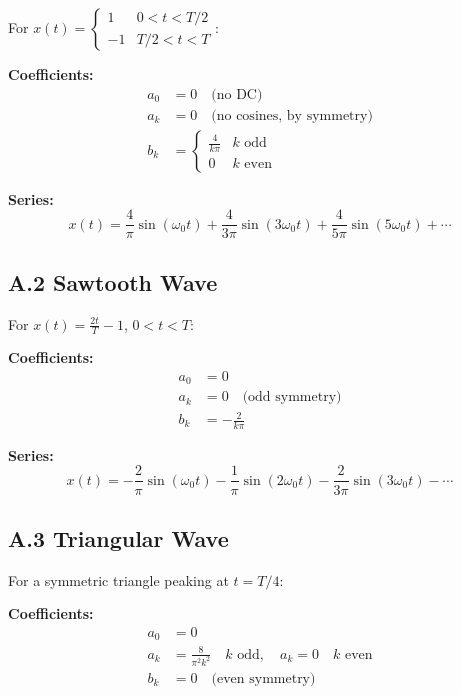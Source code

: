 \documentclass[11pt,letterpaper]{article}
\begin{document}
For $x(t) = \begin{cases} 1 & 0 < t < T/2 \\ -1 & T/2 < t < T \end{cases}$:

\textbf{Coefficients:}
\begin{align}
a_0 &= 0 \quad \text{(no DC)} \\
a_k &= 0 \quad \text{(no cosines, by symmetry)} \\
b_k &= \begin{cases} \frac{4}{k\pi} & k \text{ odd} \\ 0 & k \text{ even} \end{cases}
\end{align}

\noindent
\textbf{Series:}
\begin{equation}
x(t) = \frac{4}{\pi} \sin(\omega_0 t) + \frac{4}{3\pi} \sin(3\omega_0 t) + \frac{4}{5\pi} \sin(5\omega_0 t) + \cdots
\end{equation}

\subsection*{A.2 Sawtooth Wave}

For $x(t) = \frac{2t}{T} - 1$, $0 < t < T$:

\textbf{Coefficients:}
\begin{align}
a_0 &= 0 \\
a_k &= 0 \quad \text{(odd symmetry)} \\
b_k &= -\frac{2}{k\pi}
\end{align}

\noindent
\textbf{Series:}
\begin{equation}
x(t) = -\frac{2}{\pi} \sin(\omega_0 t) - \frac{1}{\pi} \sin(2\omega_0 t) - \frac{2}{3\pi} \sin(3\omega_0 t) - \cdots
\end{equation}

\subsection*{A.3 Triangular Wave}

For a symmetric triangle peaking at $t = T/4$:

\textbf{Coefficients:}
\begin{align}
a_0 &= 0 \\
a_k &= \frac{8}{\pi^2 k^2} \quad k \text{ odd}, \quad a_k = 0 \quad k \text{ even} \\
b_k &= 0 \quad \text{(even symmetry)}
\end{align}
\end{document}
